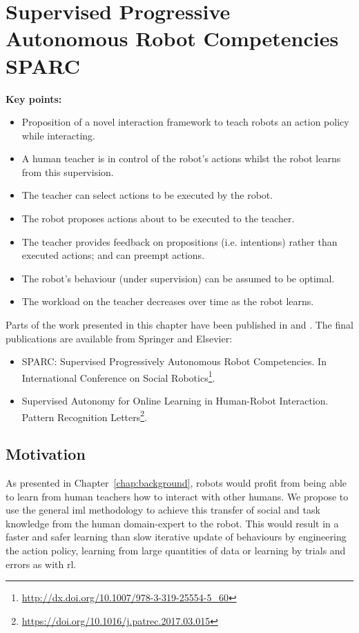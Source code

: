 \chapter{Supervised Progressive Autonomous Robot \newline Competencies SPARC}\label{chap:sparc}
\glsresetall
\graphicspath{{images/sparc/}}


\begin{framed}
	\textbf{Key points:}
	\begin{itemize}
		\item Proposition of a novel interaction framework to teach robots an action policy while interacting.
		\item A human teacher is in control of the robot's actions whilst the robot learns from this supervision.
		\item The teacher can select actions to be executed by the robot.
		\item The robot proposes actions about to be executed to the teacher.
		\item The teacher provides feedback on propositions (i.e. intentions) rather than executed actions; and can preempt actions.
		\item The robot's behaviour (under supervision) can be assumed to be optimal.
		\item The workload on the teacher decreases over time as the robot learns.
	\end{itemize}
\end{framed}

Parts of the work presented in this chapter have been published in \cite{senft2015sparc} and \cite{senft2017supervised}. The final publications are available from Springer and Elsevier:
\begin{itemize}
	\item SPARC: Supervised	Progressively Autonomous Robot Competencies. In International Conference on	Social Robotics\footnote{\url{http://dx.doi.org/10.1007/978-3-319-25554-5_60}}.
	\item Supervised Autonomy for Online Learning in Human-Robot Interaction. Pattern Recognition Letters\footnote{\url{https://doi.org/10.1016/j.patrec.2017.03.015}}.
\end{itemize}
\newpage
\section{Motivation}
As presented in Chapter~\ref{chap:background}, robots would profit from being able to learn from human teachers how to interact with other humans. We propose to use the general \gls{iml} methodology to achieve this transfer of social and task knowledge from the human domain-expert to the robot. This would result in a faster and safer learning than slow iterative update of behaviours by engineering the action policy, learning from large quantities of data or learning by trials and errors as with \gls{rl}.

